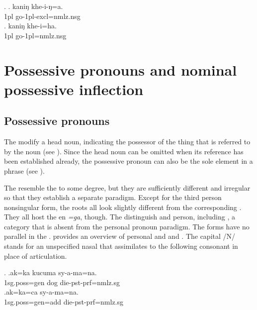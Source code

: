 \ex. \ag. 	kaniŋ khe-i-ŋ=a.\\
			{\sc 1pl} go{\sc [pst]-1pl-excl=nmlz.nsg}\\
	\bg.	kaniŋ khe-i=ha.\\
			{\sc 1pl} go{\sc [pst]-1pl=nmlz.nsg}\\


\section{Possessive pronouns and nominal possessive inflection}\label{poss-pron}

\subsection{Possessive pronouns}

The  modify a head noun, indicating the possessor of the thing that is referred to by the noun (see \Next[a]). Since the head noun can be omitted when its reference has been established already, the possessive pronoun can also be the sole element in a phrase (see \Next[b]). 

The   resemble the  to some degree, but they are sufficiently different and irregular so that they establish a separate paradigm. Except for the third person nonsingular form, the roots all look slightly different from the corresponding .  They all host the  en \emph{=ga}, though. The  distinguish  and person, including , a category that is  absent from the personal pronoun paradigm.  The  forms have no parallel in the .  provides an overview of personal and  and . The capital /N/ stands for an unspecified nasal that assimilates to the following consonant  in place of articulation.

\ex. \ag.ak=ka kucuma sy-a-ma=na.\\
{\sc 1sg.poss=gen} dog die{\sc [3sg]-pst-prf=nmlz.sg}\\
\bg.ak=ka=ca sy-a-ma=na.\\
{\sc 1sg.poss=gen=add}  die{\sc [3sg]-pst-prf=nmlz.sg}\\


